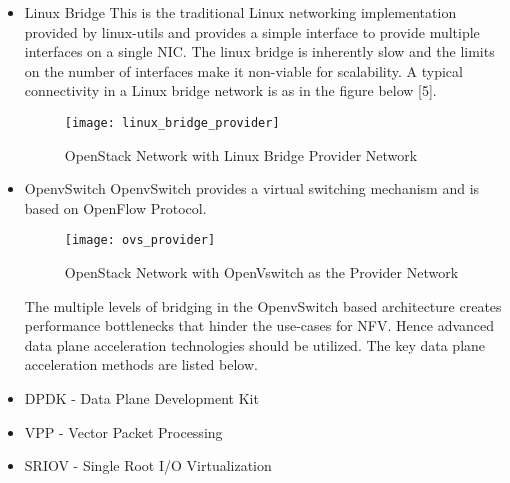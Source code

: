 \begin{enumerate}
    \begin{itemize}
        \item Linux Bridge
            This is the traditional Linux networking implementation provided by linux-utils and provides a simple interface to provide multiple interfaces on a single NIC\@. The linux bridge is inherently slow and the limits on the number of interfaces make it non-viable for scalability. A typical connectivity in a Linux bridge network is as in the figure below [5].
            \begin{figure}[h!]
		        \centering
  		        \texttt{[image: linux\_bridge\_provider]}
  		        \label{fig:figure12}
		        \caption{OpenStack Network with Linux Bridge Provider Network}
	        \end{figure}
        \item OpenvSwitch
            OpenvSwitch provides a virtual switching mechanism and is based on OpenFlow Protocol. 
            \begin{figure}[h!]
		        \centering
                \texttt{[image: ovs\_provider]}
		        \label{fig:figure16}
		        \caption{OpenStack Network with OpenVswitch as the Provider Network}
	        \end{figure}
            The multiple levels of bridging in the OpenvSwitch based architecture creates performance bottlenecks that hinder the use-cases for NFV\@. Hence advanced data plane acceleration technologies should be utilized. The key data plane acceleration methods are listed below.
	
        \item DPDK - Data Plane Development Kit
	    \item VPP - Vector Packet Processing
	    \item SRIOV - Single Root I/O Virtualization
    \end{itemize}			
\end{enumerate}
